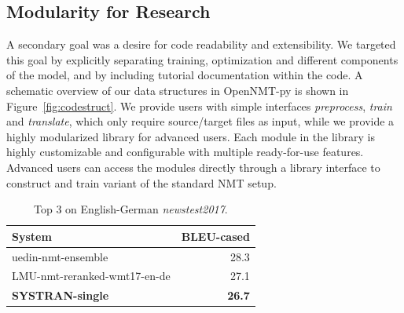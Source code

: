 \documentclass[]{article}
\begin{document}
\subsection{Modularity for Research}

A secondary goal was a desire for code readability and extensibility.
We targeted this goal by explicitly separating training, optimization and different components of the model, and by including tutorial documentation within
the code. A schematic overview of our data structures in OpenNMT-py is shown in Figure~\ref{fig:codestruct}. We provide users with simple interfaces \textit{preprocess}, \textit{train} and \textit{translate}, which only require source/target files as input, while we provide a highly modularized library for advanced users.  Each module in the library is highly customizable and configurable with multiple ready-for-use features. Advanced users can access the modules directly through a library interface to construct and train variant of the standard NMT setup.

\begin{table}
\centering
          \begin{tabular}{l r}
          \toprule
            { System} & { BLEU-cased} \\
            \midrule
            uedin-nmt-ensemble & 28.3 \\
            LMU-nmt-reranked-wmt17-en-de & 27.1 \\
            {\bf SYSTRAN-single} & {\bf 26.7} \\
            \bottomrule
          \end{tabular}
          \caption{\label{tab:wmt}Top 3 on English-German \emph{newstest2017}.}
\end{table}
\end{document}
